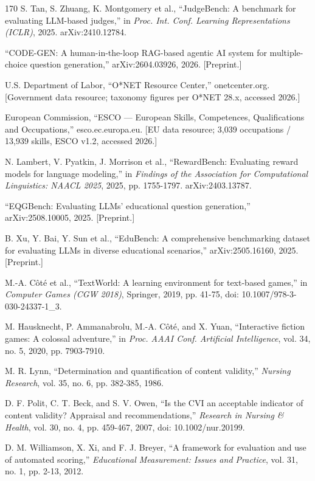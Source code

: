 \begin{thebibliography}{170}
 S. Tan, S. Zhuang, K. Montgomery et al., ``JudgeBench: A benchmark for evaluating LLM-based judges,'' in \textit{Proc. Int. Conf. Learning Representations (ICLR)}, 2025. arXiv:2410.12784.

 ``CODE-GEN: A human-in-the-loop RAG-based agentic AI system for multiple-choice question generation,'' arXiv:2604.03926, 2026. [Preprint.]

 U.S. Department of Labor, ``O*NET Resource Center,'' onetcenter.org. [Government data resource; taxonomy figures per O*NET 28.x, accessed 2026.]

 European Commission, ``ESCO --- European Skills, Competences, Qualifications and Occupations,'' esco.ec.europa.eu. [EU data resource; 3,039 occupations / 13,939 skills, ESCO v1.2, accessed 2026.]

 N. Lambert, V. Pyatkin, J. Morrison et al., ``RewardBench: Evaluating reward models for language modeling,'' in \textit{Findings of the Association for Computational Linguistics: NAACL 2025}, 2025, pp. 1755-1797. arXiv:2403.13787.

 ``EQGBench: Evaluating LLMs' educational question generation,'' arXiv:2508.10005, 2025. [Preprint.]

 B. Xu, Y. Bai, Y. Sun et al., ``EduBench: A comprehensive benchmarking dataset for evaluating LLMs in diverse educational scenarios,'' arXiv:2505.16160, 2025. [Preprint.]

 M.-A. Côté et al., ``TextWorld: A learning environment for text-based games,'' in \textit{Computer Games (CGW 2018)}, Springer, 2019, pp. 41-75, doi: 10.1007/978-3-030-24337-1\_3.

 M. Hausknecht, P. Ammanabrolu, M.-A. Côté, and X. Yuan, ``Interactive fiction games: A colossal adventure,'' in \textit{Proc. AAAI Conf. Artificial Intelligence}, vol. 34, no. 5, 2020, pp. 7903-7910.

 M. R. Lynn, ``Determination and quantification of content validity,'' \textit{Nursing Research}, vol. 35, no. 6, pp. 382-385, 1986.

 D. F. Polit, C. T. Beck, and S. V. Owen, ``Is the CVI an acceptable indicator of content validity? Appraisal and recommendations,'' \textit{Research in Nursing \& Health}, vol. 30, no. 4, pp. 459-467, 2007, doi: 10.1002/nur.20199.

 D. M. Williamson, X. Xi, and F. J. Breyer, ``A framework for evaluation and use of automated scoring,'' \textit{Educational Measurement: Issues and Practice}, vol. 31, no. 1, pp. 2-13, 2012.


\end{thebibliography}
